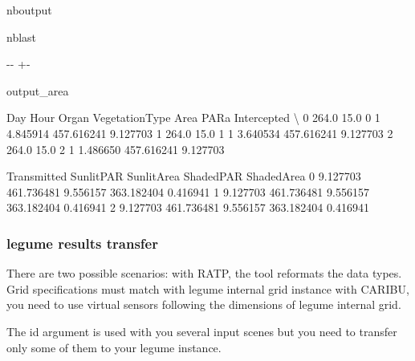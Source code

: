 \documentclass[letterpaper,10pt,english]{sphinxmanual}
\begin{document}
\begin{sphinxuseclass}{nboutput}
\begin{sphinxuseclass}{nblast}
{

\kern-\sphinxverbatimsmallskipamount\kern-\baselineskip
\kern+\FrameHeightAdjust\kern-\fboxrule
\vspace{\nbsphinxcodecellspacing}

\begin{sphinxuseclass}{output_area}
\begin{sphinxuseclass}{}


\begin{sphinxVerbatim}[commandchars=\\\{\}]
     Day  Hour  Organ  VegetationType      Area        PARa  Intercepted  \textbackslash{}
0  264.0  15.0      0               1  4.845914  457.616241     9.127703
1  264.0  15.0      1               1  3.640534  457.616241     9.127703
2  264.0  15.0      2               1  1.486650  457.616241     9.127703

   Transmitted   SunlitPAR  SunlitArea   ShadedPAR  ShadedArea
0     9.127703  461.736481    9.556157  363.182404    0.416941
1     9.127703  461.736481    9.556157  363.182404    0.416941
2     9.127703  461.736481    9.556157  363.182404    0.416941
\end{sphinxVerbatim}



\end{sphinxuseclass}
\end{sphinxuseclass}
}

\end{sphinxuseclass}
\end{sphinxuseclass}

\subsubsection{l\sphinxhyphen{}egume results transfer}
\label{\detokenize{outputs_and_plantmodels_transfer:l-egume-results-transfer}}
\sphinxAtStartPar
There are two possible scenarios: \sphinxhyphen{} with RATP, the tool reformats the data types. Grid specifications must match with l\sphinxhyphen{}egume internal grid instance \sphinxhyphen{} with CARIBU, you need to use virtual sensors following the dimensions of l\sphinxhyphen{}egume internal grid.

\sphinxAtStartPar
The id argument is used with you several input scenes but you need to transfer only some of them to your l\sphinxhyphen{}egume instance.
\end{document}
